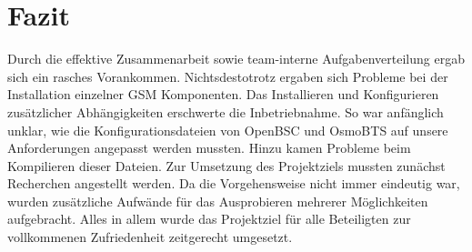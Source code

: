 \section{Fazit}
Durch die effektive Zusammenarbeit sowie team-interne Aufgabenverteilung ergab sich ein rasches Vorankommen. Nichtsdestotrotz ergaben sich Probleme bei der Installation einzelner GSM Komponenten. Das Installieren und Konfigurieren zusätzlicher Abhängigkeiten erschwerte die Inbetriebnahme. So war anfänglich unklar, wie die Konfigurationsdateien von OpenBSC und OsmoBTS auf unsere Anforderungen angepasst werden mussten. Hinzu kamen Probleme beim Kompilieren dieser Dateien. Zur Umsetzung des Projektziels mussten zunächst Recherchen angestellt werden. Da die Vorgehensweise nicht immer eindeutig war, wurden zusätzliche Aufwände für das Ausprobieren mehrerer Möglichkeiten aufgebracht. Alles in allem wurde das Projektziel für alle Beteiligten zur vollkommenen Zufriedenheit zeitgerecht umgesetzt.


